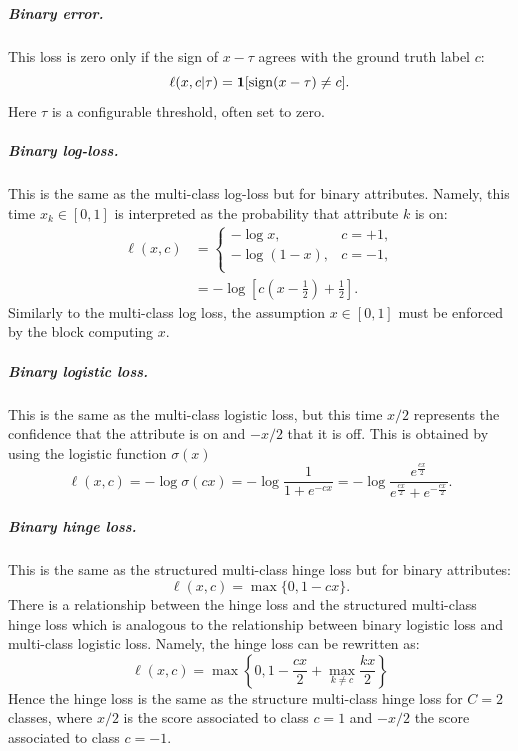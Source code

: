 \subparagraph{Binary error.} This loss is zero only if the sign of $x - \tau$ agrees with the ground truth label $c$:
\begin{equation}\label{e:loss-binary}
\ell(x,c|\tau) = \mathbf{1}[\sign(x-\tau) \not= c].
\end{equation}
Here $\tau$ is a configurable threshold, often set to zero.

\subparagraph{Binary log-loss.} This is the same as the multi-class log-loss but for binary attributes. Namely, this time $x_k \in [0,1]$ is interpreted as the probability that attribute $k$ is on:
\begin{align}\label{e:loss-binarylogloss}
\ell(x,c)
&=
\begin{cases}
- \log x, & c = +1, \\
- \log (1 - x), & c = -1, \\
\end{cases}
\\
&=
- \log \left[ c \left(x - \frac{1}{2}\right) + \frac{1}{2} \right].
\end{align}
Similarly to the multi-class log loss, the assumption $x \in [0,1]$ must be enforced by the block computing $x$.

\subparagraph{Binary logistic loss.} This is the same as the multi-class logistic loss, but this time $x/2$ represents the confidence that the attribute is on and $-x/2$ that it is off. This is obtained by using the logistic function $\sigma(x)$
\begin{equation}\label{e:loss-binarylogistic}
\ell(x,c)
=
- \log \sigma(cx)
=
-\log \frac{1}{1 + e^{-{cx}}}
=
-\log \frac{e^{\frac{cx}{2}}}{e^{\frac{cx}{2}} + e^{-\frac{cx}{2}}}.
\end{equation}

\subparagraph{Binary hinge loss.} This is the same as the structured multi-class hinge loss but for binary attributes:
\begin{equation}\label{e:loss-hinge}
\ell(x,c)
=
\max\{0, 1 - cx\}.
\end{equation}
There is a relationship between the hinge loss and the structured multi-class hinge loss which is analogous to the relationship between binary logistic loss and multi-class logistic loss. Namely, the hinge loss can be rewritten as:
\[
\ell(x,c) = \max\left\{0, 1 - \frac{cx}{2} + \max_{k\not= c} \frac{kx}{2}\right\}
\]
Hence the hinge loss is the same as the structure multi-class hinge loss for $C=2$ classes, where $x/2$ is the score associated to class $c=1$ and $-x/2$ the score associated to class $c=-1$.

